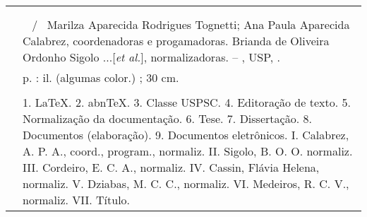 %
\begin{fichacatalografica}
   \vspace*{\fill}					%
\begin{center}					%
  \imprimirnotabib \\
  \begin{table}[htb]
	\scriptsize
	\centering	
	\begin{tabular}{|p{0.9cm} p{8.7cm}|}
		\hline
	      & \\
		  &	  \imprimirautorficha     \\
		
		 \imprimircutter & 
							\hspace{0.4cm}\imprimirtitulo~ / ~{Marilza Aparecida Rodrigues Tognetti; Ana Paula Aparecida Calabrez,  coordenadoras e progamadoras. Brianda de Oliveira Ordonho Sigolo ...[\textit{et al.}], normalizadoras}.
							 -- 	\imprimirlocal, USP, \imprimirdata.   \\
		
		  &			\hspace{0.4cm}\pageref{LastPage} p. : il. (algumas color.) ; 30 cm.\\ 
 		  & \\ 
		  & \hspace{0.4cm}1. LaTeX. 2. abnTeX. 3. Classe USPSC. 4. Editoração de texto. 5. Normalização da documentação. 6. Tese. 7. Dissertação. 8. Documentos (elaboração). 9. Documentos eletrônicos. I. Calabrez, A. P. A., coord., program., normaliz. II. Sigolo, B. O. O. normaliz. III. Cordeiro, E. C. A., normaliz. IV. Cassin, Fl\'avia Helena, normaliz. V. Dziabas, M. C. C., normaliz. VI. Medeiros, R. C. V., normaliz.  VII. Título.  \\
	
		  \hline
	\end{tabular}
  \end{table}
\end{center}
\end{fichacatalografica}
